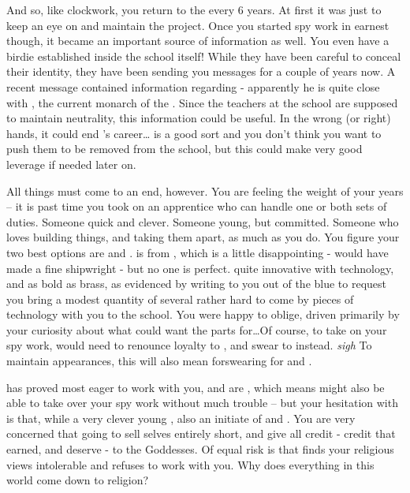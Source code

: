 \documentclass[char]{GL2020}
\begin{document}
And so, like clockwork, you return to the \pSchool{} every 6 years. At first it was just to keep an eye on and maintain the project. Once you started spy work in earnest though, it became an important source of information as well. You even have a birdie established inside the school itself!  While they have been careful to conceal their identity, they have been sending you messages for a couple of years now.  A recent message contained information regarding \cHistory{} - apparently he is quite close with \cQueen{}, the current monarch of the \pFarm{}.  Since the teachers at the school are supposed to maintain neutrality, this information could be useful. In the wrong (or right) hands, it could end \cHistory{}’s career\ldots \cHistory{} is a good sort and you don’t think you want to push them to be removed from the school, but this could make very good leverage if needed later on.

All things must come to an end, however. You are feeling the weight of your years -- it is past time you took on an apprentice who can handle one or both sets of duties. Someone quick and clever. Someone young, but committed. Someone who loves building things, and taking them apart, as much as you do. You figure your two best options are \cTechStar{} and \cInitiate{}. \cTechStar{} is from \pTech{}, which is a little disappointing - \cTechStar{\they} would have made a fine shipwright - but no one is perfect. \cTechStar{\They} \cTechStar{\are} quite innovative with technology, and as bold as brass, as evidenced by \cTechStar{\their} writing to you out of the blue to request you bring a modest quantity of several rather hard to come by pieces of technology with you to the school. You were happy to oblige, driven primarily by your curiosity about what \cTechStar{\they} could want the parts for\ldots Of course, to take on your spy work, \cTechStar{} would need to renounce loyalty to \pTech{}, and swear to \pShip{} instead. \emph{sigh} To maintain appearances, this will also mean forswearing \cTechGod{} for \cEbb{} and \cFlow{}.

\cInitiate{\full} has proved most eager to work with you, and \cInitiate{\they} are \pShip{}, which means \cInitiate{\they} might also be able to take over your spy work without much trouble -- but your hesitation with \cInitiate{} is that, while \cInitiate{\they} \cInitiate{\are} a very clever young \cInitiate{\person}, \cInitiate{\they} \cInitiate{\are} also an initiate of \cEbb{} and \cFlow{}. You are very concerned that \cInitiate{\they} \cInitiate{\are} going to sell \cInitiate{\them}selves entirely short, and give all credit - credit that \cInitiate{\they} earned, and \cInitiate{\they} deserve - to the Goddesses. Of equal risk is that \cInitiate{} finds your religious views intolerable and refuses to work with you. Why does everything in this world come down to religion?
\end{document}
